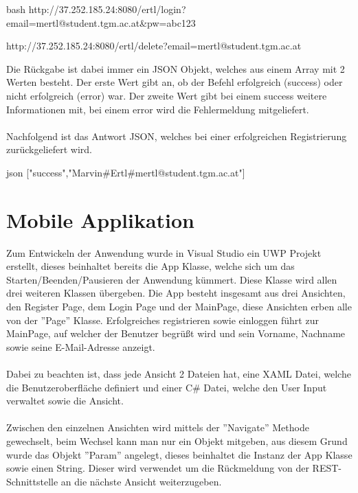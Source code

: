\begin{code}{bash}
	http://37.252.185.24:8080/ertl/login?email=mertl@student.tgm.ac.at&pw=abc123
	
	http://37.252.185.24:8080/ertl/delete?email=mertl@student.tgm.ac.at
\end{code}

Die Rückgabe ist dabei immer ein JSON Objekt, welches aus einem Array mit 2 Werten besteht. Der erste Wert gibt an, ob der Befehl erfolgreich (success) oder nicht erfolgreich (error) war. Der zweite Wert gibt bei einem success weitere Informationen mit, bei einem error wird die Fehlermeldung mitgeliefert.
\\\\
Nachfolgend ist das Antwort JSON, welches bei einer erfolgreichen Registrierung zurückgeliefert wird.

\begin{code}{json}
	["success","Marvin#Ertl#mertl@student.tgm.ac.at"]
\end{code}

\section{Mobile Applikation}

Zum Entwickeln der Anwendung wurde in Visual Studio ein UWP Projekt erstellt, dieses beinhaltet bereits die App Klasse, welche sich um das Starten/Beenden/Pausieren der Anwendung kümmert. Diese Klasse wird allen drei weiteren Klassen übergeben. Die App besteht insgesamt aus drei Ansichten, den Register Page, dem Login Page und der MainPage, diese Ansichten erben alle von der ''Page'' Klasse. Erfolgreiches registrieren sowie einloggen führt zur MainPage, auf welcher der Benutzer begrüßt wird und sein Vorname, Nachname sowie seine E-Mail-Adresse anzeigt. \cite{uwptutorial}
\\\\
Dabei zu beachten ist, dass jede Ansicht 2 Dateien hat, eine XAML Datei, welche die Benutzeroberfläche definiert und einer C\# Datei, welche den User Input verwaltet sowie die Ansicht.
\\\\
Zwischen den einzelnen Ansichten wird mittels der ''Navigate'' Methode gewechselt, beim Wechsel kann man nur ein Objekt mitgeben, aus diesem Grund wurde das Objekt ''Param'' angelegt, dieses beinhaltet die Instanz der App Klasse sowie einen String. Dieser wird verwendet um die Rückmeldung von der REST-Schnittstelle an die nächste Ansicht weiterzugeben.

